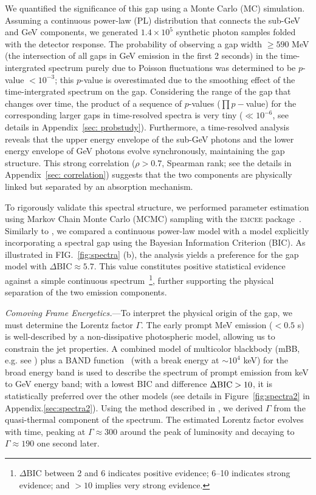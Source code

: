 \documentclass[prd,twocolumn,amsmath,amssymb,aps]{revtex4-2} %
\begin{document}
We quantified the significance of this gap using a Monte Carlo (MC) simulation. Assuming a continuous power-law (PL) distribution that connects the sub-GeV and GeV components, we generated $1.4 \times 10^5$ synthetic photon samples folded with the detector response. The probability of observing a gap width $\ge 590$ MeV (the intersection of all gaps in GeV emission in the first 2 seconds) in the time-intergrated spectrum purely due to Poisson fluctuations was determined to be $p$-value $< 10^{-3}$; this $p$-value is overestimated due to the smoothing effect of the time-intergrated spectrum on the gap. Considering the range of the gap that changes over time, the product of a sequence of $p$-values ($\prod p-$value) for the corresponding larger gaps in time-resolved spectra is very tiny ($\ll10^{-6}$, see details in Appendix~\ref{sec: probstudy}). Furthermore, a time-resolved analysis reveals that the upper energy envelope of the sub-GeV photons and the lower energy envelope of GeV photons evolve synchronously, maintaining the gap structure. This strong correlation ($\rho > 0.7$, Spearman rank; see the details in Appendix~\ref{sec: correlation}) suggests that the two components are physically linked but separated by an absorption mechanism. 


To rigorously validate this spectral structure, we performed parameter estimation using Markov Chain Monte Carlo (MCMC) sampling with the \textsc{emcee} package~\cite{2013PASP..125..306F}. Similarly to \cite{2016MNRAS.463.1144W}, we compared a continuous power-law model with a model explicitly incorporating a spectral gap using the Bayesian Information Criterion (BIC). As illustrated in FIG.~\ref{fig:spectra} (b), the analysis yields a preference for the gap model with $\Delta \mathrm{BIC} \approx 5.7$. This value constitutes positive statistical evidence against a simple continuous spectrum~\footnote{$\Delta \mathrm{BIC}$ between 2 and 6 indicates positive evidence; 6--10 indicates strong evidence; and $>10$ implies very strong evidence.}, further supporting the physical separation of the two emission components.



\textit{Comoving Frame Energetics.}---To interpret the physical origin of the gap, we must determine the Lorentz factor $\Gamma$. The early prompt MeV emission ($<0.5$ s) is well-described by a non-dissipative photospheric model, allowing us to constrain the jet properties. A combined model of multicolor blackbody (mBB, e.g. see \cite[][]{2008ApJ...682..463P,2010ApJ...709L.172R,2018ApJ...866...13H}) plus a BAND function~\citep{1993ApJ...413..281B} (with a break energy at $\sim10^4$ keV) for the broad energy band is used to describe the spectrum of prompt emission from keV to GeV energy band; with a lowest BIC and difference $\Delta \rm{BIC}>10$, it is statistically preferred over the other models (see details in Figure~\ref{fig:spectra2} in Appendix.\ref{sec:spectra2}). Using the method described in \cite{2012MNRAS.420..468P, 2024ApJ...961..137S}, we derived $\Gamma$ from the quasi-thermal component of the spectrum. The estimated Lorentz factor evolves with time, peaking at $\Gamma \approx 300$ around the peak of luminosity and decaying to $\Gamma \approx 190$ one second later. 
\end{document}
